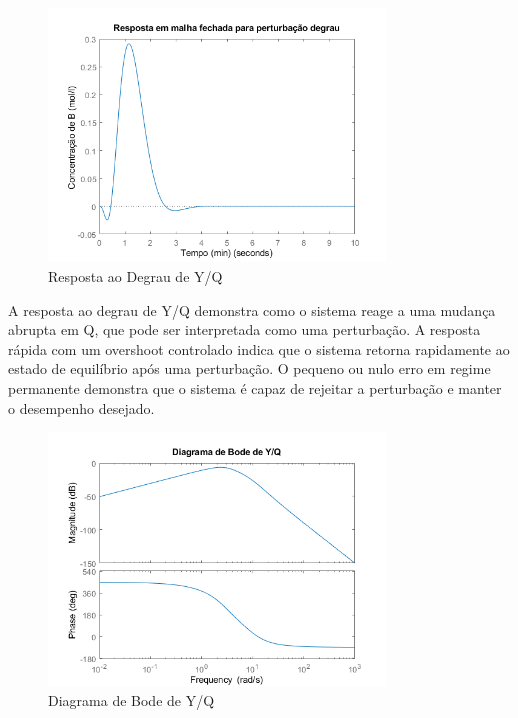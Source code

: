 \documentclass[a4paper,12pt]{article}
\begin{document}
\begin{figure}[H]
    \centering %
    \includegraphics[width=0.8\textwidth]{Imagens/1B/1BRespostaPerturbaçãoAutoral.png} %
    \caption{Resposta ao Degrau de Y/Q}
    \label{fig:exemplo} %
\end{figure}

A resposta ao degrau de Y/Q demonstra como o sistema reage a uma mudança abrupta em Q, que pode ser interpretada como uma perturbação. A resposta rápida com um overshoot controlado indica que o sistema retorna rapidamente ao estado de equilíbrio após uma perturbação. O pequeno ou nulo erro em regime permanente demonstra que o sistema é capaz de rejeitar a perturbação e manter o desempenho desejado.
 

\begin{figure}[H]
    \centering %
    \includegraphics[width=0.8\textwidth]{Imagens/1B/1BbodeYQAutoral.png} %
    \caption{Diagrama de Bode de Y/Q}   
\end{figure}
\end{document}
